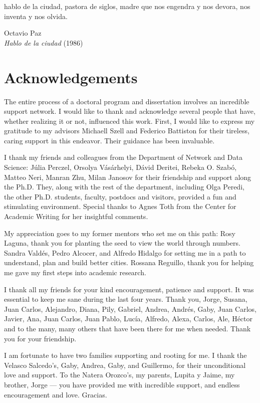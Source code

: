 \documentclass[a4paper,twoside,12pt]{book}
\begin{document}
\newpage
\frontmatter
\epigraph{hablo de la ciudad, pastora de siglos, madre que nos engendra y nos devora, nos inventa y nos olvida.}{Octavio Paz\\ \textit{Hablo de la ciudad} (1986)}
\vfill
\thispagestyle{empty}

\chapter*{Acknowledgements}
The entire process of a doctoral program and dissertation involves an incredible support network. I would like to thank and acknowledge several people that have, whether realizing it or not, influenced this work. First, I would like to express my gratitude to my advisors Michaell Szell and Federico Battiston for their tireless, caring support in this endeavor. Their guidance has been invaluable.

I thank my friends and colleagues from the Department of Network and Data Science: J\'ulia Perczel, Orsolya V\'as\'arhelyi, D\'avid Deritei, Rebeka O. Szab\'o, Matteo Neri, Manran Zhu, Milan Janosov for their friendship and support along the Ph.D. They, along with the rest of the department, including Olga Peredi, the other Ph.D. students, faculty, postdocs and visitors, provided a fun and stimulating environment. Special thanks to Agnes Toth from the Center for Academic Writing for her insightful comments.

My appreciation goes to my former mentors who set me on this path: Rosy Laguna, thank you for planting the seed to view the world through numbers. Sandra Vald\'es, Pedro Alcocer, and Alfredo Hidalgo for setting me in a path to understand, plan and build better cities. Rossana Reguillo, thank you for helping me gave my first steps into academic research.

I thank all my friends for your kind encouragement, patience and support. It was essential to keep me sane during the last four years. Thank you, Jorge, Susana, Juan Carlos, Alejandro, Diana, Pily, Gabriel, Andrea, Andr\'es, Gaby, Juan Carlos, Javier, Ana, Juan Carlos, Juan Pablo, Luc\'ia, Alfredo, Alexa, Carlos, Ale, H\'ector and to the many, many others that have been there for me when needed. Thank you for your friendship.

I am fortunate to have two families supporting and rooting for me. I thank the Velasco Salcedo's, Gaby, Andrea, Gaby, and  Guillermo, for their unconditional love and support. To the Natera Orozco's, my parents, Lupita y Jaime, my brother, Jorge — you have provided me with incredible support, and endless encouragement and love. Gracias.
\end{document}
